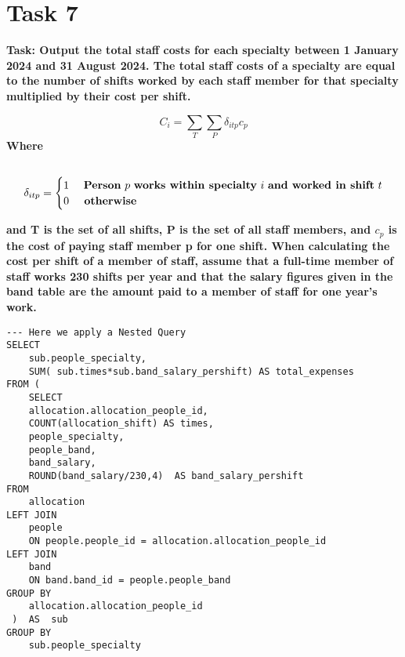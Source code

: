 \documentclass{article}
\begin{document}
\section{Task 7}

\textbf{Task: Output the total staff costs for each specialty between 1 January 2024 and 31 August
2024. The total staff costs of a specialty are equal to the number of shifts worked by
each staff member for that specialty multiplied by their cost per shift.}

\begin{equation}
C_i=\sum_T \sum_P \delta_{i t p} c_p
\end{equation}
\textbf{Where}
\begin{equation}
\begin{aligned}
&\text {  }\\
&\delta_{i t p}= \begin{cases}1 & \text { \textbf{Person} } p \text { \textbf{works within specialty} } i \text { \textbf{and worked in shift} } t \\ 0 & \textbf { otherwise }\end{cases}
\end{aligned}
\end{equation}

\textbf{and T is the set of all shifts, P is the set of all staff members, and $c_p$ is the cost of
paying staff member p for one shift. When calculating the cost per shift of a member
of staff, assume that a full-time member of staff works 230 shifts per year and that the
salary figures given in the band table are the amount paid to a member of staff for one
year’s work.}

\begin{lstlisting}[style=sqlstyle]
--- Here we apply a Nested Query
SELECT 
    sub.people_specialty,
    SUM( sub.times*sub.band_salary_pershift) AS total_expenses
FROM (
    SELECT 
    allocation.allocation_people_id,
    COUNT(allocation_shift) AS times,
    people_specialty,
    people_band,
    band_salary,
    ROUND(band_salary/230,4)  AS band_salary_pershift 
FROM 
    allocation
LEFT JOIN
    people
    ON people.people_id = allocation.allocation_people_id
LEFT JOIN
    band
    ON band.band_id = people.people_band
GROUP BY
    allocation.allocation_people_id
 )  AS  sub
GROUP BY 
    sub.people_specialty





\end{lstlisting}
\end{document}
